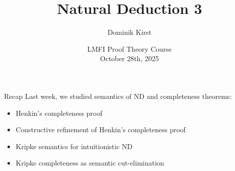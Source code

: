 \documentclass[xcolor=dvipsnames,aspectratio=169,handout]{beamer}
\title[Natural Deduction 3]{Natural Deduction 3}
\author[Dominik Kirst]{Dominik Kirst}
\date[October 28th, 2025]{LMFI Proof Theory Course\\October 28th, 2025}
\begin{document}

\newcommand\refs[1]{%
	\begin{textblock*}{8cm}(0.3cm,9.2cm)%
		\scriptsize {\color{gray}#1}
	\end{textblock*}
}

\begin{frame}
	\maketitle
\end{frame}


\begin{frame}{Recap}
	Last week, we studied semantics of ND and completeness theorems:
	\begin{itemize}
		\vspace{0.3cm}
		\item
		Henkin's completeness proof
		\vspace{0.3cm}
		\item
		Constructive refinement of Henkin's completeness proof
		\vspace{0.3cm}
		\item
		Kripke semantics for intuitionistic ND
		\vspace{0.3cm}
		\item
		Kripke completeness as semantic cut-elimination
	\end{itemize}
\end{frame}
\end{document}
